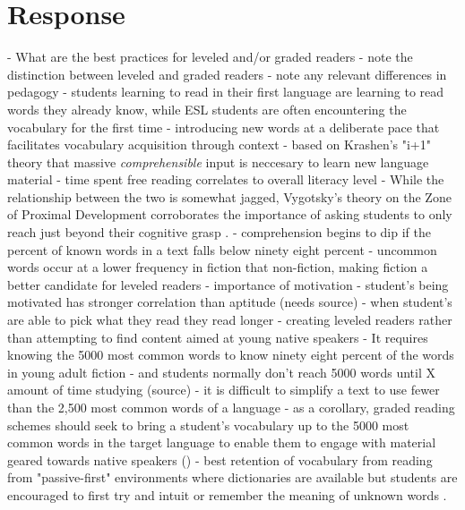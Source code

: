 \documentclass[
	letterpaper, %
]{jdf}
\begin{document}
\section{Response}

- What are the best practices for leveled and/or graded readers
  - note the distinction between leveled and graded readers
    - note any relevant differences in pedagogy
      - students learning to read in their first language are learning to read words they already know, while ESL students are often encountering the vocabulary for the first time \cite{hu_2000}
  - introducing new words at a deliberate pace that facilitates vocabulary acquisition through context
    - based on Krashen's "i+1" theory that massive \textit{comprehensible} input is neccesary to learn new language material \cite{krashenreview}
      - time spent free reading correlates to overall literacy level \cite{krashen_2004}
    - While the relationship between the two is somewhat jagged, Vygotsky's theory on the Zone of Proximal Development corroborates the importance of asking students to only reach just beyond their cognitive grasp \cite{vygotsky, vygostky_krashen_not_same}.
    - comprehension begins to dip if the percent of known words in a text falls below ninety eight percent \cite{hu_2000}
    - uncommon words occur at a lower frequency in fiction that non-fiction, making fiction a better candidate for leveled readers \cite{hu_2000}
  - importance of motivation
    - student's being motivated has stronger correlation than aptitude (needs source)
    - when student's are able to pick what they read they read longer \cite{llm_augmented_exercise_retrieval}
  - creating leveled readers rather than attempting to find content aimed at young native speakers
    - It requires knowing the 5000 most common words to know ninety eight percent of the words in young adult fiction \cite{nation1992vocabulary}
      - and students normally don't reach 5000 words until X amount of time studying (source)
    - it is difficult to simplify a text to use fewer than the 2,500 most common words of a language \cite{nation1992vocabulary}
    - as a corollary, graded reading schemes should seek to bring a student's vocabulary up to the 5000 most common words in the target language to enable them to engage with material geared towards native speakers (\cite{Nation2020GradedRA})
  - best retention of vocabulary from reading from "passive-first" environments where dictionaries are available but students are encouraged to first try and intuit or remember the meaning of unknown words \cite{mcdonald2016}.
\end{document}
